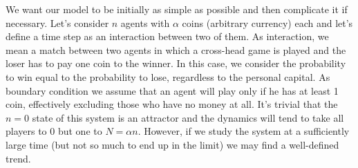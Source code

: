 We want our model to be initially as simple as possible and then complicate it if necessary.
Let's consider $n$ agents with $\alpha$ coins (arbitrary currency) each and let's define a time step as an interaction between two of them.
As interaction, we mean a match between two agents in which a cross-head game is played and the loser has to pay one coin to the winner.
In this case, we consider the probability to win equal to the probability to lose, regardless to the personal capital.
As boundary condition we assume that an agent will play only if he has at least 1 coin, effectively excluding those who have no money at all.
It's trivial that the $n = 0$ state of this system is an attractor and the dynamics will tend to take all players to 0 but one to $N = \alpha n$.
However, if we study the system at a sufficiently large time (but not so much to end up in the limit) we may find a well-defined trend.

